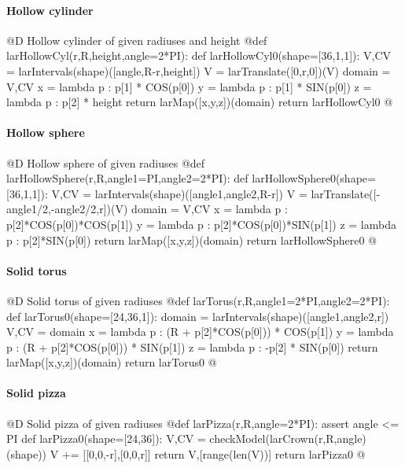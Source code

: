 \documentclass[11pt,oneside]{article}	%
\begin{document}
\paragraph{Hollow cylinder}
@D Hollow cylinder of given radiuses and height
@{def larHollowCyl(r,R,height,angle=2*PI):
	def larHollowCyl0(shape=[36,1,1]):
		V,CV = larIntervals(shape)([angle,R-r,height])
		V = larTranslate([0,r,0])(V)
		domain = V,CV
		x = lambda p : p[1] * COS(p[0])
		y = lambda p : p[1] * SIN(p[0])
		z = lambda p : p[2] * height
		return larMap([x,y,z])(domain)
	return larHollowCyl0
@}

\paragraph{Hollow sphere}
@D Hollow sphere of given radiuses
@{def larHollowSphere(r,R,angle1=PI,angle2=2*PI):
	def larHollowSphere0(shape=[36,1,1]):
		V,CV = larIntervals(shape)([angle1,angle2,R-r])
		V = larTranslate([-angle1/2,-angle2/2,r])(V)
		domain = V,CV
		x = lambda p : p[2]*COS(p[0])*COS(p[1])
		y = lambda p : p[2]*COS(p[0])*SIN(p[1])
		z = lambda p : p[2]*SIN(p[0])
		return larMap([x,y,z])(domain)
	return larHollowSphere0
@}


\paragraph{Solid torus}
@D Solid torus of given radiuses
@{def larTorus(r,R,angle1=2*PI,angle2=2*PI):
	def larTorus0(shape=[24,36,1]):
		domain = larIntervals(shape)([angle1,angle2,r])
		V,CV = domain
		x = lambda p : (R + p[2]*COS(p[0])) * COS(p[1])
		y = lambda p : (R + p[2]*COS(p[0])) * SIN(p[1])
		z = lambda p : -p[2] * SIN(p[0])
		return larMap([x,y,z])(domain)
	return larTorus0
@}

\paragraph{Solid pizza}
@D Solid pizza of given radiuses
@{def larPizza(r,R,angle=2*PI):
	assert angle <= PI
	def larPizza0(shape=[24,36]):
		V,CV = checkModel(larCrown(r,R,angle)(shape))
		V += [[0,0,-r],[0,0,r]]
		return V,[range(len(V))]
	return larPizza0
@}
\end{document}
